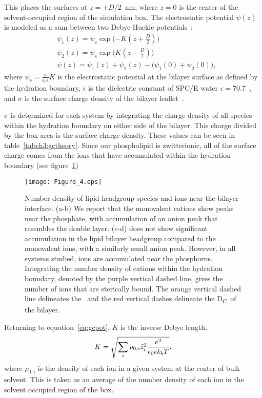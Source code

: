 This places the surfaces at $z=\pm D/2$~nm, where $z=0$ is the center of the solvent-occupied region of the simulation box.
The electrostatic potential $\psi(z)$ is modeled as a sum between two Debye-Huckle potentials~\cite{israelachvili:2011:intermol}:
\begin{align}
    &\psi_{1}(z) = \psi_s \exp\bigg({-K(z+\frac{D}{2})}\bigg)\\
    &\psi_{2}(z) = \psi_s \exp\bigg({K(z-\frac{D}{2})}\bigg)\\
    \label{eq:gcpot}
    &\psi(z) = \psi_1(z) + \psi_2(z) - \big({\psi_1(0)+\psi_2(0)}\big)\text{,}
\end{align}
where $\psi_s = \frac{\sigma}{\epsilon_0\epsilon} K$ is the electrostatic potential at the bilayer surface
as defined by the hydration boundary, $\epsilon$ 
is the dielectric constant of SPC/E water $\epsilon=70.7$~\cite{reddy:1989:dielectric}, and $\sigma$
is the surface charge density of the bilayer leaflet~\cite{israelachvili:2011:intermol}. 

$\sigma$ is determined for
each system by integrating the charge density of all species within the hydration boundary on either side of the bilayer.
This charge divided by the box area is the surface charge density.
These values can be seen in table~\ref{tabch3:gctheory}. {Since our
    phospholipid is zwitterionic, all of the surface charge comes from the
ions that have accumulated within 
the hydration boundary (see figure~\ref{figch3:dens})}
\begin{figure}[h!tb]
    \caption[Number densities]{Number density of lipid headgroup species and
    ions near the bilayer interface. (a-b) We report that the 
    monovalent cations show peaks near the phosphate, with
    accumulation of an anion peak that resembles the double layer.
    (c-d) \mg does not show significant accumulation in the 
    lipid bilayer headgroup compared to the monovalent ions,
    with a similarly small anion peak. However, in all systems
    studied, ions are accumulated near the phosphorus.
    Integrating the number density of cations within the hydration boundary,
    denoted by the purple vertical dashed line, gives the number of ions that are
    sterically bound. The orange vertical dashed line delineates the \dhh~and the 
    red vertical dashes
delineate the D\textsubscript{C}~of the bilayer.}
    \label{figch3:dens}
    \texttt{[image: Figure\_4.eps]}
\end{figure}

Returning to equation~\ref{eq:gcpot}, $K$ is the inverse Debye length,
\begin{equation}
K=\sqrt{\sum_{i} \rho_{0,i} \bar z_i^2\frac{\text{\si{\elementarycharge}}^2}{\epsilon_0 \epsilon k_bT}},
\label{eq:debyelength}
\end{equation}
where $\rho_{0,i}$ is the density of each ion in a given system at the center of bulk solvent.
This is taken as an average of the number density of each ion in the solvent occupied region of the box.

